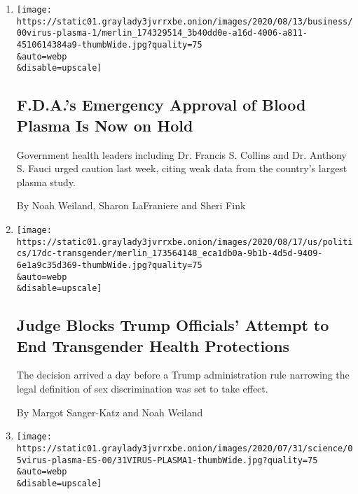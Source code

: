 \begin{enumerate}
\def\labelenumi{\arabic{enumi}.}
\item
  \href{/2020/08/19/us/politics/blood-plasma-covid-19.html}{}

  \texttt{[image: https://static01.graylady3jvrrxbe.onion/images/2020/08/13/business/00virus-plasma-1/merlin\_174329514\_3b40dd0e-a16d-4006-a811-4510614384a9-thumbWide.jpg?quality=75\\\&auto=webp\\\&disable=upscale]}

  \hypertarget{fdas-emergency-approval-of-blood-plasma-is-now-on-hold}{%
  \subsection{F.D.A.'s Emergency Approval of Blood Plasma Is Now on
  Hold}\label{fdas-emergency-approval-of-blood-plasma-is-now-on-hold}}

  Government health leaders including Dr. Francis S. Collins and Dr.
  Anthony S. Fauci urged caution last week, citing weak data from the
  country's largest plasma study.

  By Noah Weiland, Sharon LaFraniere and Sheri Fink
\item
  \href{/2020/08/17/us/politics/trump-court-transgender-rights.html}{}

  \texttt{[image: https://static01.graylady3jvrrxbe.onion/images/2020/08/17/us/politics/17dc-transgender/merlin\_173564148\_eca1db0a-9b1b-4d5d-9409-6e1a9c35d369-thumbWide.jpg?quality=75\\\&auto=webp\\\&disable=upscale]}

  \hypertarget{judge-blocks-trump-officials-attempt-to-end-transgender-health-protections}{%
  \subsection{Judge Blocks Trump Officials' Attempt to End Transgender
  Health
  Protections}\label{judge-blocks-trump-officials-attempt-to-end-transgender-health-protections}}

  The decision arrived a day before a Trump administration rule
  narrowing the legal definition of sex discrimination was set to take
  effect.

  By Margot Sanger-Katz and Noah Weiland
\item
  \href{/es/2020/08/07/espanol/ciencia-y-tecnologia/plasma-convaleciente-coronavirus.html}{}

  \texttt{[image: https://static01.graylady3jvrrxbe.onion/images/2020/07/31/science/05virus-plasma-ES-00/31VIRUS-PLASMA1-thumbWide.jpg?quality=75\\\&auto=webp\\\&disable=upscale]}


\end{enumerate}
